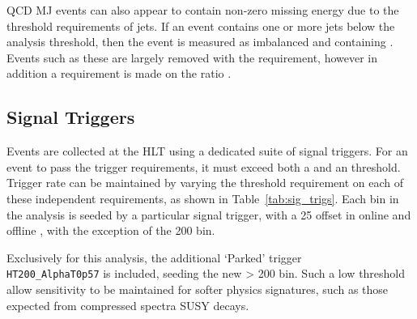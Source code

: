 QCD MJ events can also appear to contain non-zero missing energy 
due to the threshold requirements of jets. If an event contains 
one or more jets below the analysis threshold, then the 
event is measured as imbalanced and containing \mht. Events such as these are largely 
removed with the \alphat requirement, however in addition a requirement is made on the
ratio \mhtmet.



\subsection{Signal Triggers}

Events are collected at the HLT using a dedicated suite of
signal triggers. For an event to pass the trigger
requirements, it must exceed both a \HT and an \alphat threshold. Trigger rate 
can be maintained by varying the
threshold requirement on each of these independent requirements, as shown in
Table~\ref{tab:sig_trigs}. Each \HT bin in the analysis is seeded by a
particular signal
trigger, with a 25 \gev offset in online and offline \HT, with the exception of
the 200 \gev bin.

Exclusively for this analysis, the additional `Parked' trigger 
\\\verb!HT200_AlphaT0p57! is included, seeding the new \HT> 200 \gev bin. Such a low
threshold allow sensitivity to be maintained for softer physics signatures, such
as those expected from compressed spectra SUSY decays.

